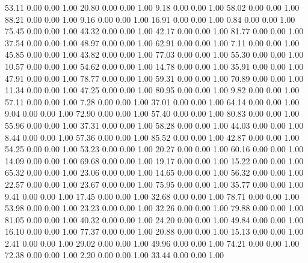    53.11   0.00   0.00   1.00
   20.80   0.00   0.00   1.00
    9.18   0.00   0.00   1.00
   58.02   0.00   0.00   1.00
   88.21   0.00   0.00   1.00
    9.16   0.00   0.00   1.00
   16.91   0.00   0.00   1.00
    0.84   0.00   0.00   1.00
   75.45   0.00   0.00   1.00
   43.32   0.00   0.00   1.00
   42.17   0.00   0.00   1.00
   81.77   0.00   0.00   1.00
   37.54   0.00   0.00   1.00
   48.97   0.00   0.00   1.00
   62.91   0.00   0.00   1.00
    7.11   0.00   0.00   1.00
   45.85   0.00   0.00   1.00
   43.82   0.00   0.00   1.00
   77.03   0.00   0.00   1.00
   55.30   0.00   0.00   1.00
   10.57   0.00   0.00   1.00
   54.62   0.00   0.00   1.00
   14.78   0.00   0.00   1.00
   35.91   0.00   0.00   1.00
   47.91   0.00   0.00   1.00
   78.77   0.00   0.00   1.00
   59.31   0.00   0.00   1.00
   70.89   0.00   0.00   1.00
   11.34   0.00   0.00   1.00
   47.25   0.00   0.00   1.00
   80.95   0.00   0.00   1.00
    9.82   0.00   0.00   1.00
   57.11   0.00   0.00   1.00
    7.28   0.00   0.00   1.00
   37.01   0.00   0.00   1.00
   64.14   0.00   0.00   1.00
    9.04   0.00   0.00   1.00
   72.90   0.00   0.00   1.00
   57.40   0.00   0.00   1.00
   80.83   0.00   0.00   1.00
   55.96   0.00   0.00   1.00
   37.31   0.00   0.00   1.00
   58.28   0.00   0.00   1.00
   44.03   0.00   0.00   1.00
    8.44   0.00   0.00   1.00
   57.36   0.00   0.00   1.00
   85.52   0.00   0.00   1.00
   42.87   0.00   0.00   1.00
   54.25   0.00   0.00   1.00
   53.23   0.00   0.00   1.00
   20.27   0.00   0.00   1.00
   60.16   0.00   0.00   1.00
   14.09   0.00   0.00   1.00
   69.68   0.00   0.00   1.00
   19.17   0.00   0.00   1.00
   15.22   0.00   0.00   1.00
   65.32   0.00   0.00   1.00
   23.06   0.00   0.00   1.00
   14.65   0.00   0.00   1.00
   56.32   0.00   0.00   1.00
   22.57   0.00   0.00   1.00
   23.67   0.00   0.00   1.00
   75.95   0.00   0.00   1.00
   35.77   0.00   0.00   1.00
    9.41   0.00   0.00   1.00
   17.45   0.00   0.00   1.00
   32.68   0.00   0.00   1.00
   78.71   0.00   0.00   1.00
   53.98   0.00   0.00   1.00
   23.23   0.00   0.00   1.00
   32.26   0.00   0.00   1.00
   79.88   0.00   0.00   1.00
   81.05   0.00   0.00   1.00
   40.32   0.00   0.00   1.00
   24.20   0.00   0.00   1.00
   49.84   0.00   0.00   1.00
   16.10   0.00   0.00   1.00
   77.37   0.00   0.00   1.00
   20.88   0.00   0.00   1.00
   15.13   0.00   0.00   1.00
    2.41   0.00   0.00   1.00
   29.02   0.00   0.00   1.00
   49.96   0.00   0.00   1.00
   74.21   0.00   0.00   1.00
   72.38   0.00   0.00   1.00
    2.20   0.00   0.00   1.00
   33.44   0.00   0.00   1.00
